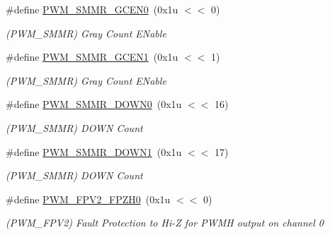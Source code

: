 \begin{DoxyCompactItemize}
\item 
\mbox{\label{group__SAMS70__PWM_gaf1518a1da5a4c1b5d32067575f8a739d}} 
\#define \mbox{\hyperlink{group__SAMS70__PWM_gaf1518a1da5a4c1b5d32067575f8a739d}{P\+W\+M\+\_\+\+S\+M\+M\+R\+\_\+\+G\+C\+E\+N0}}~(0x1u $<$$<$ 0)
\begin{DoxyCompactList}\small\item\em (P\+W\+M\+\_\+\+S\+M\+MR) Gray Count E\+Nable \end{DoxyCompactList}\item 
\mbox{\label{group__SAMS70__PWM_gada70734e4809b9886a051c44ae10bdea}} 
\#define \mbox{\hyperlink{group__SAMS70__PWM_gada70734e4809b9886a051c44ae10bdea}{P\+W\+M\+\_\+\+S\+M\+M\+R\+\_\+\+G\+C\+E\+N1}}~(0x1u $<$$<$ 1)
\begin{DoxyCompactList}\small\item\em (P\+W\+M\+\_\+\+S\+M\+MR) Gray Count E\+Nable \end{DoxyCompactList}\item 
\mbox{\label{group__SAMS70__PWM_ga761056425aa02bd82bc39edfd3c0be2a}} 
\#define \mbox{\hyperlink{group__SAMS70__PWM_ga761056425aa02bd82bc39edfd3c0be2a}{P\+W\+M\+\_\+\+S\+M\+M\+R\+\_\+\+D\+O\+W\+N0}}~(0x1u $<$$<$ 16)
\begin{DoxyCompactList}\small\item\em (P\+W\+M\+\_\+\+S\+M\+MR) D\+O\+WN Count \end{DoxyCompactList}\item 
\mbox{\label{group__SAMS70__PWM_ga9fac8e2f4988eb9487755679b524baea}} 
\#define \mbox{\hyperlink{group__SAMS70__PWM_ga9fac8e2f4988eb9487755679b524baea}{P\+W\+M\+\_\+\+S\+M\+M\+R\+\_\+\+D\+O\+W\+N1}}~(0x1u $<$$<$ 17)
\begin{DoxyCompactList}\small\item\em (P\+W\+M\+\_\+\+S\+M\+MR) D\+O\+WN Count \end{DoxyCompactList}\item 
\mbox{\label{group__SAMS70__PWM_gaf40bdd04578cb341f6d6d1f02db82135}} 
\#define \mbox{\hyperlink{group__SAMS70__PWM_gaf40bdd04578cb341f6d6d1f02db82135}{P\+W\+M\+\_\+\+F\+P\+V2\+\_\+\+F\+P\+Z\+H0}}~(0x1u $<$$<$ 0)
\begin{DoxyCompactList}\small\item\em (P\+W\+M\+\_\+\+F\+P\+V2) Fault Protection to Hi-\/Z for P\+W\+MH output on channel 0 \end{DoxyCompactList}\item 
$$
\end{DoxyCompactItemize}
